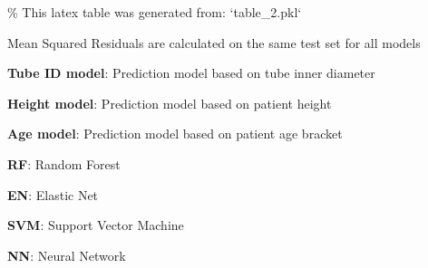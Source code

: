 \documentclass[11pt]{article}
\begin{document}
\begin{codeoutput}
\% This latex table was generated from: `table\_2.pkl`
\begin{table}[h]
\caption{Mean Squared Residuals for each model}
\label{table:mean\_squared\_residuals}
\begin{threeparttable}
\renewcommand{\TPTminimum}{\linewidth}
\begin{tablenotes}
\footnotesize
\item Mean Squared Residuals are calculated on the same test set for all models
\item \textbf{Tube ID model}: Prediction model based on tube inner diameter
\item \textbf{Height model}: Prediction model based on patient height
\item \textbf{Age model}: Prediction model based on patient age bracket
\item \textbf{RF}: Random Forest
\item \textbf{EN}: Elastic Net
\item \textbf{SVM}: Support Vector Machine
\item \textbf{NN}: Neural Network
\end{tablenotes}
\end{threeparttable}
\end{table}
\end{codeoutput}
\end{document}
